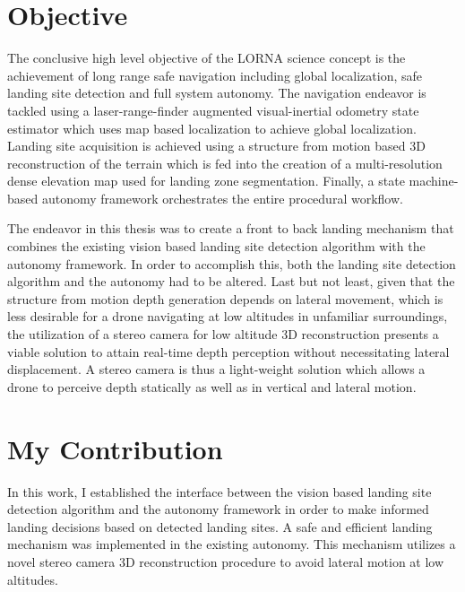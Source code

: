 \section{Objective}

The conclusive high level objective of the LORNA science concept is the achievement of long range safe navigation including global localization, safe landing site detection and full system autonomy. The navigation endeavor is tackled using a laser-range-finder augmented visual-inertial odometry state estimator which uses map based localization to achieve global localization. Landing site acquisition is achieved using a structure from motion based 3D reconstruction of the terrain which is fed into the creation of a multi-resolution dense elevation map used for landing zone segmentation. Finally, a state machine-based autonomy framework orchestrates the entire procedural workflow.

The endeavor in this thesis was to create a front to back landing mechanism that combines the existing vision based landing site detection algorithm with the autonomy framework. In order to accomplish this, both the landing site detection algorithm and the autonomy had to be altered. Last but not least, given that the structure from motion depth generation depends on lateral movement, which is less desirable for a drone navigating at low altitudes in unfamiliar surroundings, the utilization of a stereo camera for low altitude 3D reconstruction presents a viable solution to attain real-time depth perception without necessitating lateral displacement. A stereo camera is thus a light-weight solution which allows a drone to perceive depth statically as well as in vertical and lateral motion.

\section{My Contribution}
In this work, I established the interface between the vision based landing site detection algorithm and the autonomy framework in order to make informed landing decisions based on detected landing sites. A safe and efficient landing mechanism was implemented in the existing autonomy. This mechanism utilizes a novel stereo camera 3D reconstruction procedure to avoid lateral motion at low altitudes.

